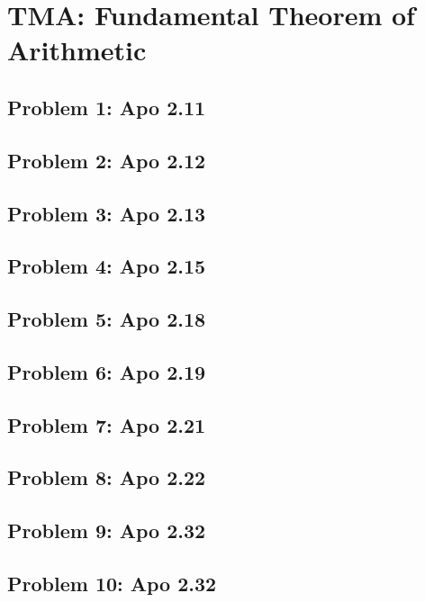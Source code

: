 \section{TMA: Fundamental Theorem of Arithmetic}

\subsection[Problem 1]{Problem 1: Apo 2.11}

\subsection[Problem 2]{Problem 2: Apo 2.12}

\subsection[Problem 3]{Problem 3: Apo 2.13}

\subsection[Problem 4]{Problem 4: Apo 2.15}

\subsection[Problem 5]{Problem 5: Apo 2.18}

\subsection[Problem 6]{Problem 6: Apo 2.19}

\subsection[Problem 7]{Problem 7: Apo 2.21}

\subsection[Problem 8]{Problem 8: Apo 2.22}

\subsection[Problem 9]{Problem 9: Apo 2.32}

\subsection[Problem 10]{Problem 10: Apo 2.32}
